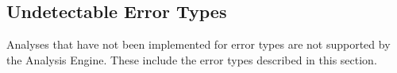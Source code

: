 \subsection{Undetectable Error Types}

Analyses that have not been implemented for error types are not supported by the Analysis Engine. These include the error types described in this section.

